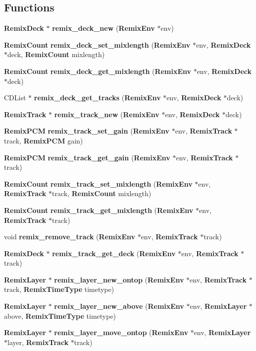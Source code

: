 \subsection*{Functions}
\begin{CompactItemize}
\item 
{\bf Remix\-Deck} $\ast$ {\bf remix\_\-deck\_\-new} ({\bf Remix\-Env} $\ast$env)
\item 
{\bf Remix\-Count} {\bf remix\_\-deck\_\-set\_\-mixlength} ({\bf Remix\-Env} $\ast$env, {\bf Remix\-Deck} $\ast$deck, {\bf Remix\-Count} mixlength)
\item 
{\bf Remix\-Count} {\bf remix\_\-deck\_\-get\_\-mixlength} ({\bf Remix\-Env} $\ast$env, {\bf Remix\-Deck} $\ast$deck)
\item 
CDList $\ast$ {\bf remix\_\-deck\_\-get\_\-tracks} ({\bf Remix\-Env} $\ast$env, {\bf Remix\-Deck} $\ast$deck)
\item 
{\bf Remix\-Track} $\ast$ {\bf remix\_\-track\_\-new} ({\bf Remix\-Env} $\ast$env, {\bf Remix\-Deck} $\ast$deck)
\item 
{\bf Remix\-PCM} {\bf remix\_\-track\_\-set\_\-gain} ({\bf Remix\-Env} $\ast$env, {\bf Remix\-Track} $\ast$track, {\bf Remix\-PCM} gain)
\item 
{\bf Remix\-PCM} {\bf remix\_\-track\_\-get\_\-gain} ({\bf Remix\-Env} $\ast$env, {\bf Remix\-Track} $\ast$track)
\item 
{\bf Remix\-Count} {\bf remix\_\-track\_\-set\_\-mixlength} ({\bf Remix\-Env} $\ast$env, {\bf Remix\-Track} $\ast$track, {\bf Remix\-Count} mixlength)
\item 
{\bf Remix\-Count} {\bf remix\_\-track\_\-get\_\-mixlength} ({\bf Remix\-Env} $\ast$env, {\bf Remix\-Track} $\ast$track)
\item 
void {\bf remix\_\-remove\_\-track} ({\bf Remix\-Env} $\ast$env, {\bf Remix\-Track} $\ast$track)
\item 
{\bf Remix\-Deck} $\ast$ {\bf remix\_\-track\_\-get\_\-deck} ({\bf Remix\-Env} $\ast$env, {\bf Remix\-Track} $\ast$track)
\item 
{\bf Remix\-Layer} $\ast$ {\bf remix\_\-layer\_\-new\_\-ontop} ({\bf Remix\-Env} $\ast$env, {\bf Remix\-Track} $\ast$track, {\bf Remix\-Time\-Type} timetype)
\item 
{\bf Remix\-Layer} $\ast$ {\bf remix\_\-layer\_\-new\_\-above} ({\bf Remix\-Env} $\ast$env, {\bf Remix\-Layer} $\ast$above, {\bf Remix\-Time\-Type} timetype)
\item 
{\bf Remix\-Layer} $\ast$ {\bf remix\_\-layer\_\-move\_\-ontop} ({\bf Remix\-Env} $\ast$env, {\bf Remix\-Layer} $\ast$layer, {\bf Remix\-Track} $\ast$track)

\end{CompactItemize}
